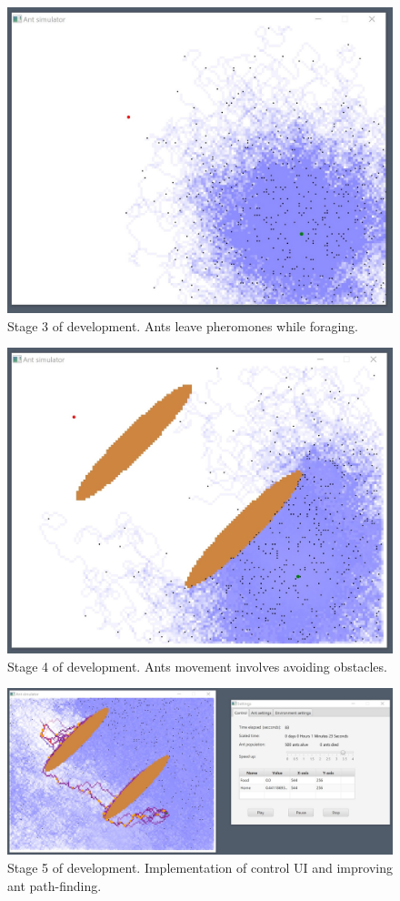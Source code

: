 \documentclass[a4paper, oneside, 11pt]{report}
\begin{document}
\begin{figure}[htb]
	\begin{center}
		\includegraphics[width=0.65 \columnwidth]{Stage_3.jpg}
		\caption{Stage 3 of development. Ants leave pheromones while foraging.}
		\label{fig:Stage 3}
	\end{center}
\end{figure}

\begin{figure}[htb]
	\begin{center}
		\includegraphics[width=0.65 \columnwidth]{Stage_4.jpg}
		\caption{Stage 4 of development. Ants movement involves avoiding obstacles.}
		\label{fig:Stage 4}
	\end{center}
\end{figure}

\begin{figure}[htb]
	\begin{center}
		\includegraphics[width=1.0 \columnwidth]{Stage_5.jpg}
		\caption{Stage 5 of development. Implementation of control UI and improving ant path-finding.}
		\label{fig:Stage 5}
	\end{center}
\end{figure}
\end{document}
